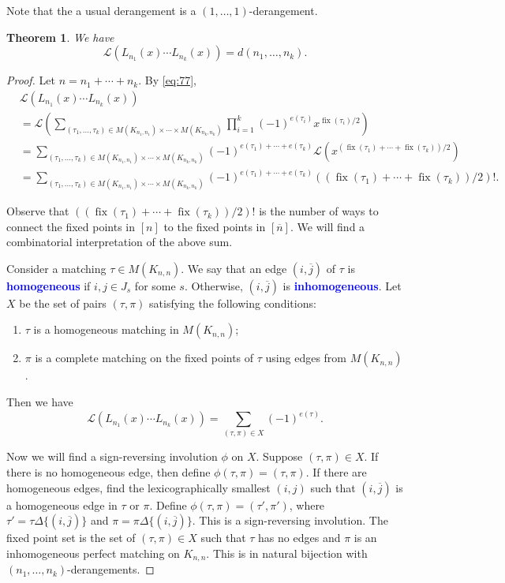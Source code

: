 \documentclass[oneside]{book}
\numberwithin{equation}{section}
\newtheorem{thm}{Theorem}[section]
\theoremstyle{definition}
\newcommand\fix{\operatorname{fix}}
\newcommand\LL{\mathcal{L}}
\renewcommand\emph[1]{\textcolor{blue}{\bf #1}}
\begin{document}
Note that the a usual derangement is a \( (1,\dots,1) \)-derangement.


\begin{thm}
  We have
\[
  \LL(L_{n_1}(x)\cdots L_{n_k}(x)) = d(n_1,\dots,n_k).
\]
\end{thm}

\begin{proof}
  Let \( n= n_1 + \cdots + n_k \). By \eqref{eq:77},
  \begin{align*}
    &  \LL \left( L_{n_1}(x)\cdots L_{n_k}(x) \right)\\
    & =  \LL\left( \sum_{(\tau_1,\dots,\tau_k)\in M(K_{n_1,n_1}) \times \cdots \times M(K_{n_k,n_k})}
      \prod_{i=1}^{k} (-1)^{e(\tau_i)} x^{\fix(\tau_i)/2} \right)\\
    & =  \sum_{(\tau_1,\dots,\tau_k)\in M(K_{n_1,n_1}) \times \cdots \times M(K_{n_k,n_k})}
      (-1)^{e(\tau_1) + \cdots + e(\tau_k)}
      \LL\left( x^{(\fix(\tau_1) + \cdots + \fix(\tau_k))/2} \right)\\
    & =  \sum_{(\tau_1,\dots,\tau_k)\in M(K_{n_1,n_1}) \times \cdots \times M(K_{n_k,n_k})}
      (-1)^{e(\tau_1) + \cdots + e(\tau_k)}
      ((\fix(\tau_1) + \cdots + \fix(\tau_k))/2)! .
\end{align*}

Observe that \( ((\fix(\tau_1) + \cdots + \fix(\tau_k))/2)! \) is the
number of ways to connect the fixed points in \( [n] \) to the fixed
points in \( [\overline{n}] \). We will find a combinatorial interpretation of the above sum.

Consider a matching \( \tau \in M(K_{n,n}) \). We say that an edge
\( (i,\overline{j}) \) of \( \tau \) is \emph{homogeneous} if
\( i,j\in J_s \) for some \( s \). Otherwise, \( (i,\overline{j}) \)
is \emph{inhomogeneous}. Let \( X \) be the set of pairs
\( (\tau,\pi) \) satisfying the following conditions:
\begin{enumerate}
\item \( \tau \) is a homogeneous matching in \( M(K_{n,n}) \);
\item \( \pi \) is a complete matching on the fixed points of
  \( \tau \) using edges from \( M(K_{n,n}) \).
\end{enumerate}
Then we have
\[
    \LL \left( L_{n_1}(x)\cdots L_{n_k}(x) \right)
 = \sum_{(\tau,\pi)\in X}  (-1)^{e(\tau)}.
\]

Now we will find a sign-reversing involution \( \phi \) on \( X \).
Suppose \( (\tau,\pi)\in X \). If there is no homogeneous edge, then
define \( \phi(\tau,\pi) = (\tau,\pi) \). If there are homogeneous
edges, find the lexicographically smallest \( (i,j) \) such that
\( (i,\overline{j}) \) is a homogeneous edge in \( \tau \) or
\( \pi \). Define \( \phi(\tau,\pi) = (\tau',\pi') \), where
\( \tau' = \tau \Delta \{(i,\overline{j}) \} \) and
\( \pi = \pi \Delta \{(i,\overline{j}) \} \). This is a sign-reversing
involution. The fixed point set is the set of \( (\tau,\pi)\in X \)
such that \( \tau \) has no edges and \( \pi \) is an inhomogeneous
perfect matching on \( K_{n,n} \). This is in natural bijection with
\( (n_1,\dots,n_k) \)-derangements.
\end{proof}
\end{document}
